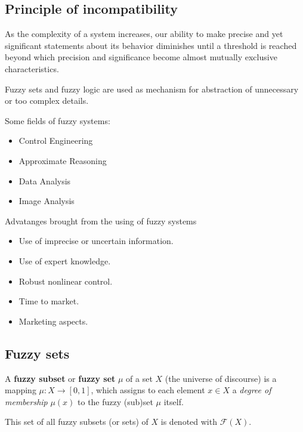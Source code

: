 \documentclass{article}
\begin{document}
\subsection{Principle of incompatibility}
As the complexity of a system increases, our ability to make precise and yet significant
statements about its behavior diminishes until a threshold is reached beyond which precision
and significance become almost mutually exclusive characteristics.

Fuzzy sets and fuzzy logic are used as mechanism for abstraction of unnecessary or too
complex details.

Some fields of fuzzy systems:
\begin{itemize}
    \item Control Engineering
    \item Approximate Reasoning
    \item Data Analysis
    \item Image Analysis
\end{itemize}
Advatanges brought from the using of fuzzy systems
\begin{itemize}
    \item Use of imprecise or uncertain information.
    \item Use of expert knowledge.
    \item Robust nonlinear control.
    \item Time to market.
    \item Marketing aspects.
\end{itemize}

\subsection{Fuzzy sets}
A \textbf{fuzzy subset} or \textbf{fuzzy set} $\mu$ of a set $X$ (the universe of
discourse) is a mapping $\mu : X\rightarrow [0,1]$, which assigns to each element $x\in X$
a \textit{degree of membership} $\mu(x)$ to the fuzzy (sub)set $\mu$ itself.

This set of all fuzzy subsets (or sets) of $X$ is denoted with $\mathcal{F}(X)$.
\end{document}
